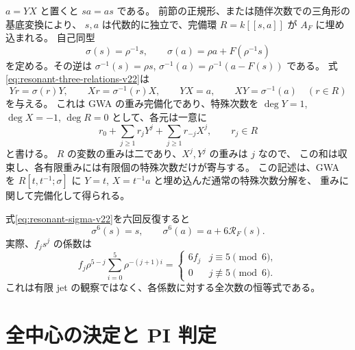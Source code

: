 $a=YX$ と置くと $sa=as$ である。
前節の正規形、または随伴次数での三角形の基底変換により、
$s,a$ は代数的に独立で、完備環 $R=k[[s,a]]$ が $A_F$ に埋め込まれる。
自己同型
\begin{equation}
 \sigma(s)=\rho^{-1}s,\qquad
 \sigma(a)=\rho a+F(\rho^{-1}s)
 \label{eq:resonant-sigma-v22}
\end{equation}
を定める。その逆は
$\sigma^{-1}(s)=\rho s$, $\sigma^{-1}(a)=\rho^{-1}(a-F(s))$ である。
式\eqref{eq:resonant-three-relations-v22}は
\[
 Yr=\sigma(r)Y,\qquad Xr=\sigma^{-1}(r)X,\qquad
 YX=a,\qquad XY=\sigma^{-1}(a)\quad(r\in R)
\]
を与える。
これは GWA の重み完備化であり、特殊次数を $\deg Y=1$, $\deg X=-1$,
$\deg R=0$ として、各元は一意に
\begin{equation}
 r_0+\sum_{j\ge1}r_jY^j+\sum_{j\ge1}r_{-j}X^j,
 \qquad r_j\in R
 \label{eq:resonant-special-decomposition-v22}
\end{equation}
と書ける。
$R$ の変数の重みは二であり、$X^j,Y^j$ の重みは $j$ なので、
この和は収束し、各有限重みには有限個の特殊次数だけが寄与する。
この記述は、GWA を $R[t,t^{-1};\sigma]$ に
$Y=t$, $X=t^{-1}a$ と埋め込んだ通常の特殊次数分解を、
重みに関して完備化して得られる。

式\eqref{eq:resonant-sigma-v22}を六回反復すると
\begin{equation}
 \sigma^6(s)=s,\qquad \sigma^6(a)=a+6\mathcal R_F(s).
 \label{eq:resonant-sixth-iterate-v22}
\end{equation}
実際、$f_js^j$ の係数は
\[
 f_j\rho^{5-j}\sum_{i=0}^5\rho^{-(j+1)i}
 =\begin{cases}6f_j&j\equiv5\pmod6,\\0&j\not\equiv5\pmod6.
 \end{cases}
\]
これは有限 jet の観察ではなく、各係数に対する全次数の恒等式である。

\section{全中心の決定と PI 判定}

